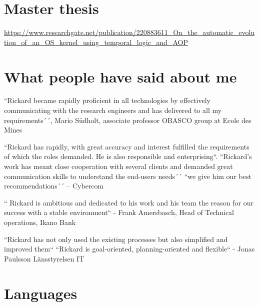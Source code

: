 \documentclass[11pt,a4paper,sans]{moderncv}}
\begin{document}
\section{Master thesis}
\url{https://www.researchgate.net/publication/220883611\_On_the_automatic_evolution_of_an_OS_kernel_using_temporal_logic_and_AOP}

\section{What people have said about me}
\large 

\begin{quotelist}
    \item
    ``Rickard became rapidly proficient in all technologies by effectively communicating with the research engineers and has delivered to all my requirements´´,
      Mario Südholt, associate professor OBASCO group at Ecole des Mines 
\item
        ``Rickard has rapidly, with great accuracy and interest fulfilled the requirements of which the roles demanded.  He is also responsible and enterprising``. ``Rickard’s work has meant close cooperation with several clients and demanded great communication skills to understand the end-users needs´´ 
        ``we give him our best recommendations´´ – Cybercom 
\item     
        `` Rickard is ambitious and dedicated to his work and his team the reason for our success with a stable environment``  - Frank Amersbasch, Head of Technical operations, Ikano Bank 
\item  ``Rickard has not only used the existing processes but also simplified and improved them`` ``Rickard is goal-oriented, planning-oriented and flexible``  - Jonas Paulsson Länsstyrelsen IT 
       
  \end{quotelist}

\section{Languages}
\end{document}
